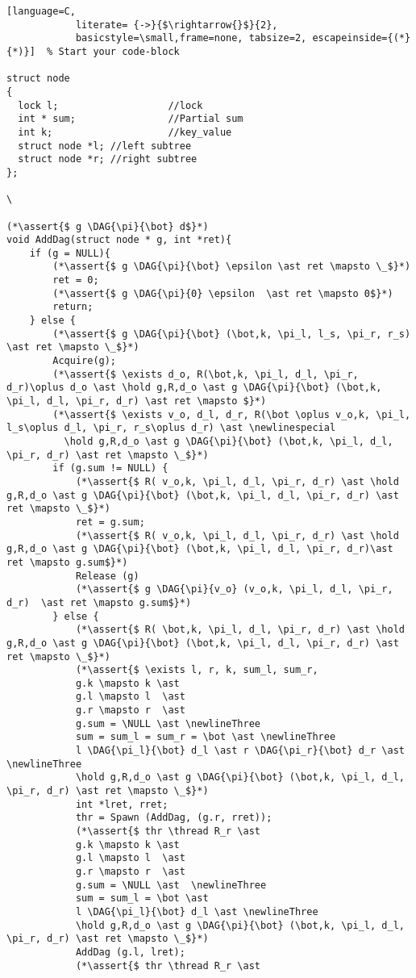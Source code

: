 \documentclass[8pt]{article}
\newcommand{\thread}{\ocircle \hspace{-1ex} \rightarrow}
\newcommand{\hold}{\text{Hold }}
\newcommand{\assert}[1]{\textcolor{blue}{ \{ #1 \}  } }
\newcommand{\NULL}{\text{NULL }}
\newcommand{\newlinespecial}{\newline \hphantom{100pt}}
\newcommand{\newlineThree}{\newline \hphantom{100pt}\hphantom{100pt}}
\newcommand{\DAG}[2]{ \underset{#2}{\overset{#1}{\dag}} }
\begin{document}
\begin{lstlisting}[language=C,
			literate= {->}{$\rightarrow{}$}{2},
			basicstyle=\small,frame=none, tabsize=2, escapeinside={(*}{*)}]  % Start your code-block

struct node
{
  lock l;					//lock
  int * sum;				//Partial sum
  int k;					//key_value
  struct node *l; //left subtree
  struct node *r; //right subtree
};

\

(*\assert{$ g \DAG{\pi}{\bot} d$}*)
void AddDag(struct node * g, int *ret){
	if (g = NULL){
		(*\assert{$ g \DAG{\pi}{\bot} \epsilon \ast ret \mapsto \_$}*)
		ret = 0;
		(*\assert{$ g \DAG{\pi}{0} \epsilon  \ast ret \mapsto 0$}*)
		return;
	} else {
		(*\assert{$ g \DAG{\pi}{\bot} (\bot,k, \pi_l, l_s, \pi_r, r_s) \ast ret \mapsto \_$}*)
		Acquire(g);
		(*\assert{$ \exists d_o, R(\bot,k, \pi_l, d_l, \pi_r, d_r)\oplus d_o \ast \hold g,R,d_o \ast g \DAG{\pi}{\bot} (\bot,k, \pi_l, d_l, \pi_r, d_r) \ast ret \mapsto $}*)
		(*\assert{$ \exists v_o, d_l, d_r, R(\bot \oplus v_o,k, \pi_l, l_s\oplus d_l, \pi_r, r_s\oplus d_r) \ast \newlinespecial
		  \hold g,R,d_o \ast g \DAG{\pi}{\bot} (\bot,k, \pi_l, d_l, \pi_r, d_r) \ast ret \mapsto \_$}*)
		if (g.sum != NULL) {
			(*\assert{$ R( v_o,k, \pi_l, d_l, \pi_r, d_r) \ast \hold g,R,d_o \ast g \DAG{\pi}{\bot} (\bot,k, \pi_l, d_l, \pi_r, d_r) \ast ret \mapsto \_$}*)
			ret = g.sum;
			(*\assert{$ R( v_o,k, \pi_l, d_l, \pi_r, d_r) \ast \hold g,R,d_o \ast g \DAG{\pi}{\bot} (\bot,k, \pi_l, d_l, \pi_r, d_r)\ast ret \mapsto g.sum$}*)
			Release (g)
			(*\assert{$ g \DAG{\pi}{v_o} (v_o,k, \pi_l, d_l, \pi_r, d_r)  \ast ret \mapsto g.sum$}*)
		} else {
			(*\assert{$ R( \bot,k, \pi_l, d_l, \pi_r, d_r) \ast \hold g,R,d_o \ast g \DAG{\pi}{\bot} (\bot,k, \pi_l, d_l, \pi_r, d_r) \ast ret \mapsto \_$}*)
			(*\assert{$ \exists l, r, k, sum_l, sum_r,
			g.k \mapsto k \ast
			g.l \mapsto l  \ast
			g.r \mapsto r  \ast
			g.sum = \NULL \ast \newlineThree
			sum = sum_l = sum_r = \bot \ast \newlineThree
			l \DAG{\pi_l}{\bot} d_l \ast r \DAG{\pi_r}{\bot} d_r \ast \newlineThree
			\hold g,R,d_o \ast g \DAG{\pi}{\bot} (\bot,k, \pi_l, d_l, \pi_r, d_r) \ast ret \mapsto \_$}*)
			int *lret, rret;
			thr = Spawn (AddDag, (g.r, rret));
			(*\assert{$ thr \thread R_r \ast
			g.k \mapsto k \ast
			g.l \mapsto l  \ast
			g.r \mapsto r  \ast
			g.sum = \NULL \ast  \newlineThree
			sum = sum_l = \bot \ast
			l \DAG{\pi_l}{\bot} d_l \ast \newlineThree
			\hold g,R,d_o \ast g \DAG{\pi}{\bot} (\bot,k, \pi_l, d_l, \pi_r, d_r) \ast ret \mapsto \_$}*)
			AddDag (g.l, lret);
			(*\assert{$ thr \thread R_r \ast

\end{lstlisting}
\end{document}
